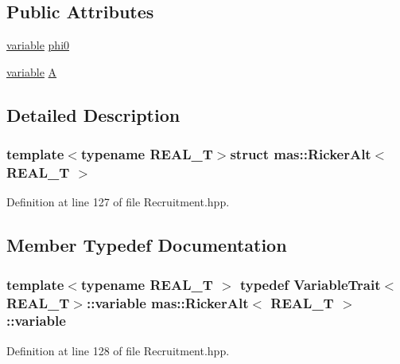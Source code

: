 \subsection*{Public Attributes}
\begin{DoxyCompactItemize}
\item 
\hyperlink{structmas_1_1_ricker_alt_a3f6410d01fd55ca163120cb17b862cd8}{variable} \hyperlink{structmas_1_1_ricker_alt_a64d1ad551ce910d6ccab77e80c3a217a}{phi0}
\item 
\hyperlink{structmas_1_1_ricker_alt_a3f6410d01fd55ca163120cb17b862cd8}{variable} \hyperlink{structmas_1_1_ricker_alt_a17b23c9c97b4e4992afafcca81062db8}{A}
\end{DoxyCompactItemize}


\subsection{Detailed Description}
\subsubsection*{template$<$typename R\-E\-A\-L\-\_\-\-T$>$struct mas\-::\-Ricker\-Alt$<$ R\-E\-A\-L\-\_\-\-T $>$}



Definition at line 127 of file Recruitment.\-hpp.



\subsection{Member Typedef Documentation}
\hypertarget{structmas_1_1_ricker_alt_a3f6410d01fd55ca163120cb17b862cd8}{
\subsubsection[{variable}]{\setlength{\rightskip}{0pt plus 5cm}template$<$typename R\-E\-A\-L\-\_\-\-T $>$ typedef {\bf Variable\-Trait}$<$R\-E\-A\-L\-\_\-\-T$>$\-::{\bf variable} {\bf mas\-::\-Ricker\-Alt}$<$ R\-E\-A\-L\-\_\-\-T $>$\-::{\bf variable}}}\label{structmas_1_1_ricker_alt_a3f6410d01fd55ca163120cb17b862cd8}


Definition at line 128 of file Recruitment.\-hpp.



